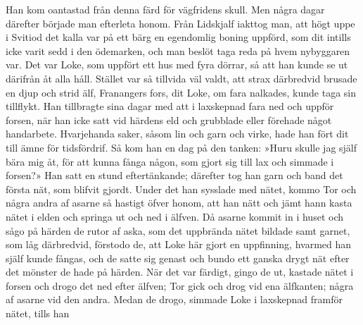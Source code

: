 Han kom oantastad från denna färd för vägfridens skull. Men några dagar
därefter började man efterleta honom. Från Lidskjalf iakttog man, att
högt uppe i Svitiod det kalla var på ett bärg en egendomlig boning
uppförd, som dit intills icke varit sedd i den ödemarken, och man beslöt
taga reda på hvem nybyggaren var. Det var Loke, som uppfört ett hus med
fyra dörrar, så att han kunde se ut därifrån åt alla håll. Stället var
så tillvida väl valdt, att strax därbredvid brusade en djup och strid
älf, Franangers fors, dit Loke, om fara nalkades, kunde taga sin
tillflykt. Han tillbragte sina dagar med att i laxskepnad fara ned och
uppför forsen, när han icke satt vid härdens eld och grubblade eller
förehade något handarbete. Hvarjehanda saker, såsom lin och garn och
virke, hade han fört dit till ämne för tidsfördrif. Så kom han en dag på
den tanken: »Huru skulle jag själf bära mig åt, för att kunna fånga
någon, som gjort sig till lax och simmade i forsen?» Han satt en stund
eftertänkande; därefter tog han garn och band det första nät, som
blifvit gjordt. Under det han sysslade med nätet, kommo Tor och några
andra af asarne så hastigt öfver honom, att han nätt och jämt hann kasta
nätet i elden och springa ut och ned i älfven. Då asarne kommit in i
huset och sågo på härden de rutor af aska, som det uppbrända nätet
bildade samt garnet, som låg därbredvid, förstodo de, att Loke här gjort
en uppfinning, hvarmed han själf kunde fångas, och de satte sig genast
och bundo ett ganska drygt nät efter det mönster de hade på härden. När
det var färdigt, gingo de ut, kastade nätet i forsen och drogo det ned
efter älfven; Tor gick och drog vid ena älfkanten; några af asarne vid
den andra. Medan de drogo, simmade Loke i laxskepnad framför nätet,
tills han

